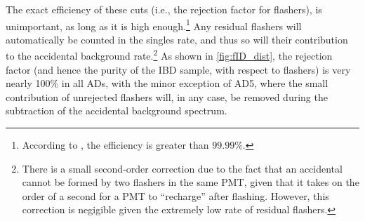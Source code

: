 \documentclass[../thesis.tex]{subfiles}
\begin{document}
The exact efficiency of these cuts (i.e., the rejection factor for flashers), is unimportant, as long as it is high enough.\footnote{According to \cite{SideBySide}, the efficiency is greater than $99.99\%$.} Any residual flashers will automatically be counted in the singles rate, and thus so will their contribution to the accidental background rate.\footnote{There is a small second-order correction due to the fact that an accidental cannot be formed by two flashers in the same PMT, given that it takes on the order of a second for a PMT to ``recharge'' after flashing. However, this correction is negigible given the extremely low rate of residual flashers.} As shown in \autoref{fig:fID_dist}, the rejection factor (and hence the purity of the IBD sample, with respect to flashers) is very nearly 100\% in all ADs, with the minor exception of AD5, where the small contribution of unrejected flashers will, in any case, be removed during the subtraction of the accidental background spectrum.
\end{document}
